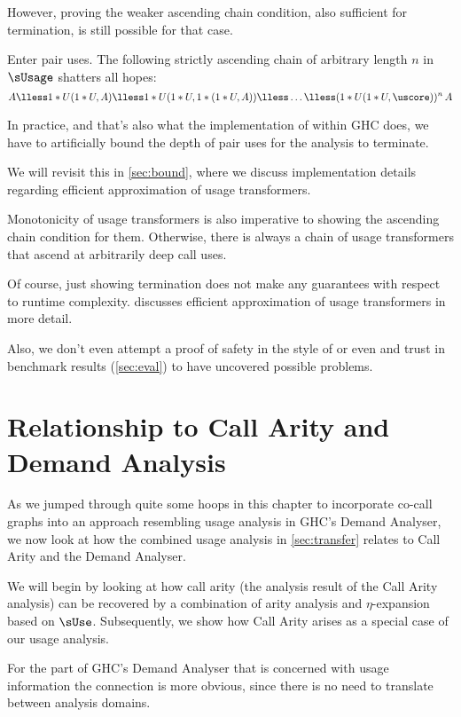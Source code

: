 However, proving the weaker ascending chain condition, also sufficient for termination, is still possible for that case.

Enter pair uses. The following strictly ascending chain of arbitrary length $n$ in $\sUsage$ shatters all hopes:
\[
  A \lless 1*U(1*U, A) \lless 1*U(1*U, 1*(1*U, A)) \lless \ldots \lless (1*U(1*U,\uscore))^n\,A
\]

In practice, and that's also what the implementation of \textcite{card} within GHC does, we have to artificially bound the depth of pair uses for the analysis to terminate.

We will revisit this in \cref{sec:bound}, where we discuss implementation details regarding efficient approximation of usage transformers.

Monotonicity of usage transformers is also imperative to showing the ascending chain condition for them. 
Otherwise, there is always a chain of usage transformers that ascend at arbitrarily deep call uses.

Of course, just showing termination does not make any guarantees with respect to runtime complexity. 
 discusses efficient approximation of usage transformers in more detail.

Also, we don't even attempt a proof of safety in the style of \textcite{card} or even \textcite{callarity} and trust in benchmark results (\cf \cref{sec:eval}) to have uncovered possible problems.

\section{Relationship to Call Arity and Demand Analysis}\label{sec:generalise}

As we jumped through quite some hoops in this chapter to incorporate co-call graphs into an approach resembling usage analysis in GHC's Demand Analyser, we now look at how the combined usage analysis in \cref{sec:transfer} relates to Call Arity and the Demand Analyser.

We will begin by looking at how call arity (the analysis result of the Call Arity analysis) can be recovered by a combination of arity analysis and $\eta$-expansion based on $\sUse$. 
Subsequently, we show how Call Arity arises as a special case of our usage analysis.

For the part of GHC's Demand Analyser that is concerned with usage information \parencite{card} the connection is more obvious, since there is no need to translate between analysis domains.

